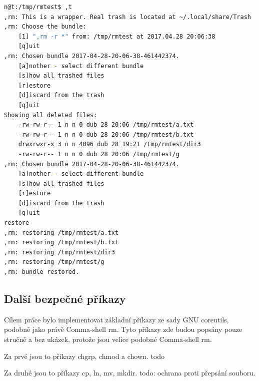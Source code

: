 \documentclass[thesis=M,czech]{FITthesis}[2012/06/26]
\begin{document}
\begin{minipage}{\linewidth}
\begin{lstlisting}[language=bash, caption={,rm - obnova souborů }, label={lst:rmwrapp7}]
n@t:/tmp/rmtest$ ,t
,rm: This is a wrapper. Real trash is located at ~/.local/share/Trash
,rm: Choose the bundle:
    [1] ",rm -r *" from: /tmp/rmtest at 2017.04.28 20:06:38
    [q]uit
,rm: Chosen bundle 2017-04-28-20-06-38-461442374.
    [a]nother - select different bundle
    [s]how all trashed files
    [r]estore
    [d]iscard from the trash
    [q]uit
Showing all deleted files:
    -rw-rw-r-- 1 n n 0 dub 28 20:06 /tmp/rmtest/a.txt
    -rw-rw-r-- 1 n n 0 dub 28 20:06 /tmp/rmtest/b.txt
    drwxrwxr-x 3 n n 4096 dub 28 19:21 /tmp/rmtest/dir3
    -rw-rw-r-- 1 n n 0 dub 28 20:06 /tmp/rmtest/g
,rm: Chosen bundle 2017-04-28-20-06-38-461442374.
    [a]nother - select different bundle
    [s]how all trashed files
    [r]estore
    [d]iscard from the trash
    [q]uit
restore
,rm: restoring /tmp/rmtest/a.txt
,rm: restoring /tmp/rmtest/b.txt
,rm: restoring /tmp/rmtest/dir3
,rm: restoring /tmp/rmtest/g
,rm: bundle restored.
\end{lstlisting}
\end{minipage}


\subsection{Další bezpečné příkazy}

Cílem práce bylo implementovat základní příkazy ze sady GNU coreutils, podobně jako právě Comma-shell rm. Tyto příkazy zde budou popsány pouze stručně a bez ukázek, protože jsou velice podobné Comma-shell rm.

Za prvé jsou to příkazy chgrp, chmod a chown. todo

Za druhé jsou to příkazy cp, ln, mv, mkdir. todo: ochrana proti přepsání souboru.



\end{document}
